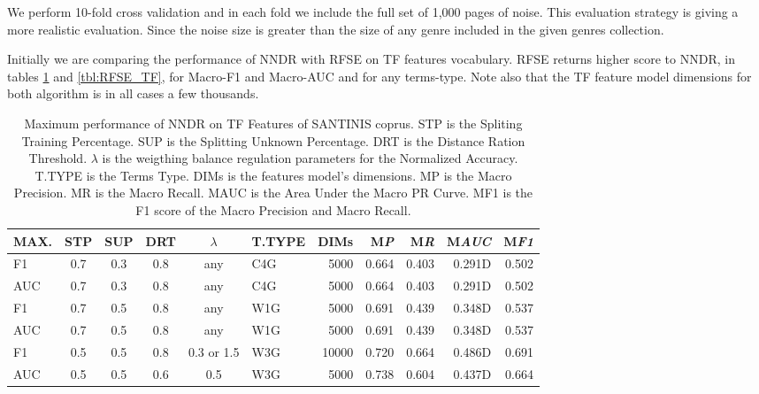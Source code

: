 \documentclass[runningheads]{llncs}
\begin{document}
We perform  10-fold cross validation and in each fold we include the full set of 1,000 pages of noise. This evaluation strategy is giving a more realistic evaluation. Since the noise size is greater than the size of any genre included in the given genres collection.

Initially we are comparing the performance of NNDR with RFSE on TF features vocabulary. RFSE returns higher score to NNDR, in tables \ref{tbl:NNDR_TF} and \ref{tbl:RFSE_TF}, for Macro-F1 and Macro-AUC and for any terms-type. Note also that the TF feature model dimensions for both algorithm is in all cases a few thousands.

\pagebreak

\begin{table}
\center
\begin{tabular}{|l|cccc|lr|rrrr|}
\hline
MAX. & STP & SUP & DRT & $\lambda$ & T.TYPE & DIMs & M\emph{P} & M\emph{R} & M\emph{AUC} & M\emph{F1} \\
\hline
F1 & 0.7 & 0.3 & 0.8 & any & C4G & 5000 & 0.664 & 0.403 & 0.291D & 0.502 \\
AUC & 0.7 & 0.3 & 0.8 & any & C4G & 5000 & 0.664 & 0.403 & 0.291D & 0.502 \\
F1 & 0.7 & 0.5 & 0.8 & any & W1G & 5000 & 0.691 & 0.439 & 0.348D & 0.537 \\
AUC & 0.7 & 0.5 & 0.8 & any & W1G & 5000 & 0.691 & 0.439 & 0.348D & 0.537 \\
F1 & 0.5 & 0.5 & 0.8 & 0.3 or 1.5 & W3G & 10000 & 0.720 & 0.664 & 0.486D & 0.691 \\
AUC & 0.5 & 0.5 & 0.6 & 0.5 & W3G & 5000 & 0.738 & 0.604 & 0.437D & 0.664 \\
\hline
\end{tabular}
\caption {Maximum performance of NNDR on TF Features of SANTINIS coprus. STP is the Spliting Training Percentage. SUP is the Splitting Unknown Percentage. DRT is the Distance Ration Threshold. $\lambda$ is the weigthing balance regulation parameters for the Normalized Accuracy. T.TYPE is the Terms Type. DIMs is the features model's dimensions. MP is the Macro Precision. MR is the Macro Recall. MAUC is the Area Under the Macro PR Curve. MF1 is the F1 score of the Macro Precision and Macro Recall.}
\label{tbl:NNDR_TF}
\vspace{-15mm}
\end{table}
\end{document}
